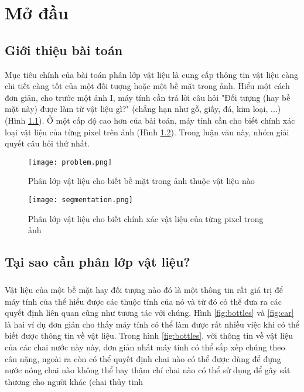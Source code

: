 
\chapter{Mở đầu}
\ifpdf
    \graphicspath{{Chapter1/Chapter1Figs/PNG/}{Chapter1/Chapter1Figs/PDF/}{Chapter1/Chapter1Figs/}}
\else
    \graphicspath{{Chapter1/Chapter1Figs/EPS/}{Chapter1/Chapter1Figs/}}
\fi

\section{Giới thiệu bài toán}
Mục tiêu chính của bài toán phân lớp vật liệu là cung cấp thông tin vật liệu càng chi tiết càng tốt của một đối tượng hoặc một bề mặt trong ảnh. Hiểu một cách đơn giản, cho trước một ảnh I, máy tính cần trả lời câu hỏi "Đối tượng (hay bề mặt này) được làm từ vật liệu gì?" (chẳng hạn như gỗ, giấy, đá, kim loại, ...) (Hình \ref{fig:problem}). Ở một cấp độ cao hơn của bài toán, máy tính cần cho biết chính xác loại vật liệu của từng pixel trên ảnh (Hình \ref{fig:seg}). Trong luận văn này, nhóm giải quyết câu hỏi thứ nhất.

\begin{figure}[h!]
	\centering
	\captionsetup{width=0.9\textwidth}
	\texttt{[image: problem.png]}
	\caption{Phân lớp vật liệu cho biết bề mặt trong ảnh thuộc vật liệu nào}
    \label{fig:problem}
\end{figure}

\begin{figure}[h!]
	\centering
	\captionsetup{width=0.9\textwidth}
	\texttt{[image: segmentation.png]}
	\caption{Phân lớp vật liệu cho biết chính xác vật liệu của từng pixel trong ảnh}
    \label{fig:seg}
\end{figure}

\pagebreak

\section{Tại sao cần phân lớp vật liệu?}
\paragraph*{}
Vật liệu của một bề mặt hay đối tượng nào đó là một thông tin rất giá trị để máy tính của thể hiểu được các thuộc tính của nó và từ đó có thể đưa ra các quyết định liên quan cũng như tương tác với chúng. Hình \ref{fig:bottles} và \ref{fig:car} là hai ví dụ đơn giản cho thấy máy tính có thể làm được rất nhiều việc khi có thể biết được thông tin về vật liệu. Trong hình \ref{fig:bottles}, với thông tin về vật liệu của các chai nước này này, đơn giản nhất máy tính có thể sắp xếp chúng theo cân nặng, ngoài ra còn có thể quyết định chai nào có thể được dùng để đựng nước nóng chai nào không thể hay thậm chí chai nào có thể sử dụng để gây sát thương cho người khác (chai thủy tinh

